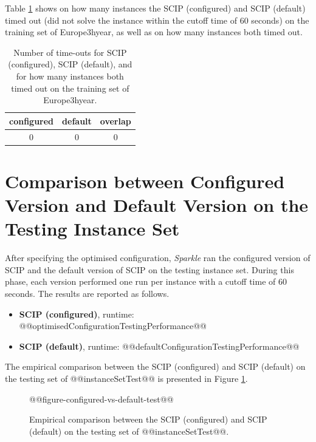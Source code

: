 \documentclass[british]{article}
\newif\iftest
\newif\ifruntime
\begin{document}

Table \ref{tbl:timeouts_train} shows on how many instances the SCIP (configured) and SCIP (default) timed out (did not solve the instance within the cutoff time of 60 seconds) on the training set of Europe\textunderscore 3h\textunderscore year, as well as on how many instances both timed out.

    \begin{table}[htbp]
        \centering
            \begin{tabular}{ccc}
                configured & default & overlap \\ \hline
                0 & 0 & 0
            \end{tabular}
            \caption{Number of time-outs for SCIP (configured), SCIP (default), and for how many instances both timed out on the training set of Europe\textunderscore 3h\textunderscore year.}
        \label{tbl:timeouts_train}
    \end{table}


\iftest
    \section{Comparison between Configured Version and Default Version on the Testing Instance Set}

    After specifying the optimised configuration, \emph{Sparkle} ran the configured version of SCIP and the default version of SCIP on the testing instance set. During this phase, each version performed one run per instance with a cutoff time of 60 seconds. The results are reported as follows.

    \begin{itemize}
        \item \textbf{SCIP (configured)}, runtime: @@optimisedConfigurationTestingPerformance@@
        \item \textbf{SCIP (default)}, runtime: @@defaultConfigurationTestingPerformance@@
    \end{itemize}

    The empirical comparison between the SCIP (configured) and SCIP (default) on the testing set of @@instanceSetTest@@ is presented in Figure \ref{fig:configured_vs_default_test}.

    \begin{figure}[htbp]
        \noindent
        \begin{centering}
            @@figure-configured-vs-default-test@@
            \par
        \end{centering}

       \caption{Empirical comparison between the SCIP (configured) and SCIP (default) on the testing set of @@instanceSetTest@@.}\label{fig:configured_vs_default_test}
    \end{figure}
\end{document}
